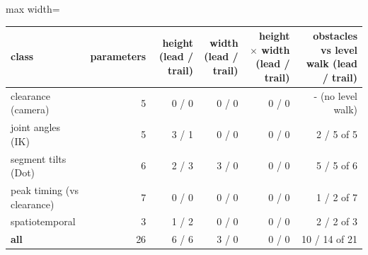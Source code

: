 \begin{adjustbox}{max width=\textwidth}
{\footnotesize
\begin{tabular}{lrrrrr}
\toprule
\textbf{class} & \textbf{parameters} & \textbf{height (lead / trail)} & \textbf{width (lead / trail)} & \textbf{height $\times$ width (lead / trail)} & \textbf{obstacles vs level walk (lead / trail)} \\
\midrule
clearance (camera) & 5 & 0 / 0 & 0 / 0 & 0 / 0 & - (no level walk) \\
joint angles (IK) & 5 & 3 / 1 & 0 / 0 & 0 / 0 & 2 / 5 of 5 \\
segment tilts (Dot) & 6 & 2 / 3 & 3 / 0 & 0 / 0 & 5 / 5 of 6 \\
peak timing (vs clearance) & 7 & 0 / 0 & 0 / 0 & 0 / 0 & 1 / 2 of 7 \\
spatiotemporal & 3 & 1 / 2 & 0 / 0 & 0 / 0 & 2 / 2 of 3 \\
\textbf{all} & 26 & 6 / 6 & 3 / 0 & 0 / 0 & 10 / 14 of 21 \\
\bottomrule
\end{tabular}
}
\end{adjustbox}
